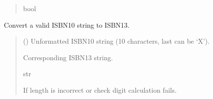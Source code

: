 \documentclass[letterpaper,10pt,english]{sphinxmanual}
\begin{document}
\begin{fulllineitems}
\begin{fulllineitems}
\begin{quote}
\begin{description}
\sphinxAtStartPar
bool

\end{description}\end{quote}

\end{fulllineitems}


\begin{fulllineitems}
\label{\detokenize{apache_commons_validator_python.routines:apache_commons_validator_python.routines.isbn_validator.ISBNValidator.convert_to_isbn13}}
\pysigstartsignatures
{}
\pysigstopsignatures
\sphinxAtStartPar
Convert a valid ISBN\sphinxhyphen{}10 string to ISBN\sphinxhyphen{}13.
\begin{quote}\begin{description}
\sphinxAtStartPar
{} () \textendash{} Unformatted ISBN\sphinxhyphen{}10 string (10 characters, last can be ‘X’).

\sphinxAtStartPar
Corresponding ISBN\sphinxhyphen{}13 string.

\sphinxAtStartPar
str

\sphinxAtStartPar
{} \textendash{} If length is incorrect or check digit calculation fails.

\end{description}\end{quote}

\end{fulllineitems}



\end{fulllineitems}
\end{document}
